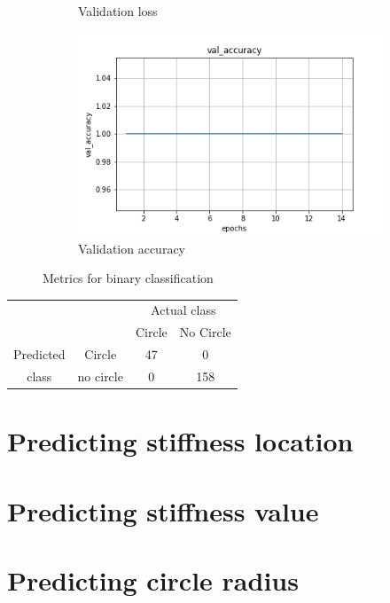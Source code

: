 \documentclass{article}
\begin{document}
\begin{figure}
\begin{subfigure}[b]{0.45\textwidth}
    \caption{Validation loss}
  \end{subfigure}
%
\begin{subfigure}[b]{0.45\textwidth}
    \centering
    \includegraphics[totalheight=4cm]{circle_id/binary/plotval_accuracy.png}
    \caption{Validation accuracy}
  \end{subfigure}
\caption{\label{fig:binarymetrics} Metrics for binary classification}
\end{figure}
%
\begin{center}
  \begin{tabular}{cccc}
    \cline{3-4}
    & & \multicolumn{2}{|c|}{Actual class}  \\
    \cline{3-4}
    & & \multicolumn{1}{|c|}{Circle} &  \multicolumn{1}{|c|}{No Circle}\\
    \hline
    \multicolumn{1}{|c}{Predicted} & \multicolumn{1}{|c|}{Circle} & \multicolumn{1}{|c|}{47} & \multicolumn{1}{|c|}{0} \\
    \cline{2-4}
    \multicolumn{1}{|c}{class} & \multicolumn{1}{|c|}{no circle} & \multicolumn{1}{|c|}{0} & \multicolumn{1}{|c|}{158}\\
    \hline
  \end{tabular}
\end{center}
\section{Predicting stiffness location}
%
\section{Predicting stiffness value}
%
\section{Predicting circle radius}
%
\end{document}
